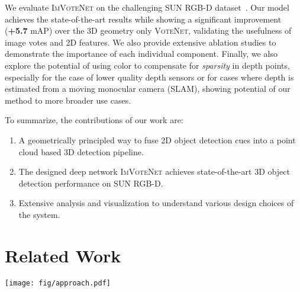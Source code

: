 \documentclass[10pt,twocolumn,letterpaper]{article}
\newcommand{\votenet}{\textsc{VoteNet}\xspace}
\newcommand{\imvotenet}{\textsc{ImVoteNet}\xspace}
\newcommand{\rgbd}{\texttt{RGB-D}\xspace}
\begin{document}
We evaluate \imvotenet on the challenging SUN RGB-D dataset~\cite{song2015sun}.
Our model achieves the state-of-the-art results while showing a significant improvement ({\bf +5.7} mAP) over the 3D geometry only \votenet, validating the usefulness of image votes and 2D features. We also provide extensive ablation studies to demonstrate the importance of each individual component. 
Finally, we also explore the potential of using color to compensate for \emph{sparsity} in depth points, especially for the case of lower quality depth sensors or for cases where depth is estimated from a moving monocular camera (SLAM), showing potential of our method to more broader use cases.

To summarize, the contributions of our work are:
\begin{enumerate}
    \item A geometrically principled way to fuse 2D object detection cues into a point cloud based 3D detection pipeline. 
    \item The designed deep network \imvotenet achieves state-of-the-art 3D object detection performance on SUN RGB-D.
    \item Extensive analysis and visualization to understand various design choices of the system.
\end{enumerate}

 
\section{Related Work}
\begin{figure*}[ht!]
    \centering
    \texttt{[image: fig/approach.pdf]}
    \vspace{2mm}
    \caption{\textbf{3D object detection pipeline for \imvotenet.}
Given \rgbd input (with the depth image converted to a point cloud), the model initially have two separate branches: one for 2D object detection on the image and the other for point cloud feature extraction (with a PointNet++~\cite{qi2017pointnetplusplus} backbone) on the point clouds. Then we lift 2D image votes as well as semantic and texture cues to the 3D seed points (the fusion part). The seed points with concatenated image and point cloud features then generate votes towards 3D object centers and also propose 3D bounding boxes with its features (the joint tower). To push for more effective multi-modality fusion, we have two other towers that take image features only (image tower) and point cloud features only (point tower) for voting and box proposals.}
    \label{fig:pipeline}
\end{figure*}
\end{document}

